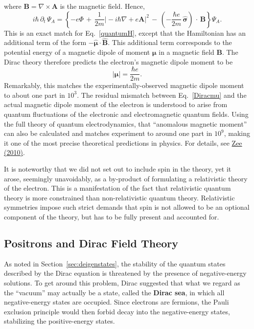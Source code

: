 \documentclass[pra,12pt]{revtex4}
\begin{document}
where $\mathbf{B} = \nabla\times\mathbf{A}$ is the magnetic field.
Hence,
\begin{equation}
  i\hbar\, \partial_t \, \Psi_A
  = \left\{-e\Phi
  \,+\, \frac{1}{2m} \big|-i\hbar\nabla +e\mathbf{A} \big|^2
  \,-\, \left(-\frac{\hbar e}{2m}\, \hat{\boldsymbol{\sigma}}\right)
  \,\cdot\, \mathbf{B} \right\} \Psi_A.
\end{equation}
This is an exact match for Eq.~\eqref{quantumH}, except that the
Hamiltonian has an additional term of the form $-
\hat{\boldsymbol{\mu}} \cdot \hat{\mathbf{B}}$.  This additional term
corresponds to the potential energy of a magnetic dipole of moment
$\boldsymbol{\mu}$ in a magnetic field $\mathbf{B}$.  The Dirac theory
therefore predicts the electron's magnetic dipole moment to be
\begin{equation}
  |\boldsymbol{\mu}| = \frac{\hbar e}{2m}.
  \label{Diracmu}
\end{equation}
Remarkably, this matches the experimentally-observed magnetic dipole
moment to about one part in $10^3$.  The residual mismatch between
Eq.~\eqref{Diracmu} and the actual magnetic dipole moment of the
electron is understood to arise from quantum fluctuations of the
electronic and electromagnetic quantum fields.  Using the full theory
of quantum electrodynamics, that ``anomalous magnetic moment'' can
also be calculated and matches experiment to around one part in
$10^9$, making it one of the most precise theoretical predictions in
physics.  For details, see \hyperref[cite:zee]{Zee (2010)}.

It is noteworthy that we did not set out to include spin in the
theory, yet it arose, seemingly unavoidably, as a by-product of
formulating a relativistic theory of the electron.  This is a
manifestation of the fact that relativistic quantum theory is more
constrained than non-relativistic quantum theory.  Relativistic
symmetries impose such strict demands that spin is not allowed to be
an optional component of the theory, but has to be fully present and
accounted for.

\subsection{Positrons and Dirac Field Theory}
\label{sec:positrons}

As noted in Section~\ref{sec:deigenstates}, the stability of the
quantum states described by the Dirac equation is threatened by the
presence of negative-energy solutions.  To get around this problem,
Dirac suggested that what we regard as the ``vacuum'' may actually be
a state, called the \textbf{Dirac sea}, in which all negative-energy
states are occupied.  Since electrons are fermions, the Pauli
exclusion principle would then forbid decay into the negative-energy
states, stabilizing the positive-energy states.
\end{document}
